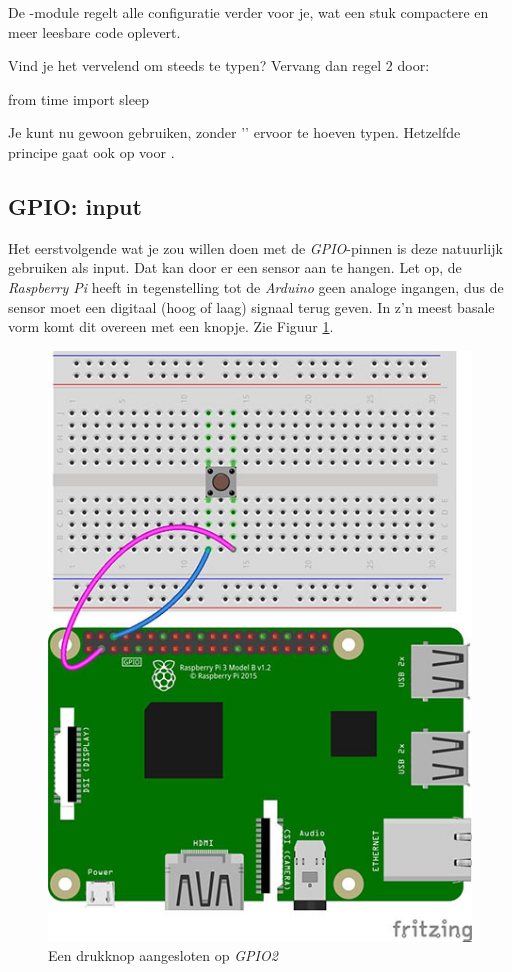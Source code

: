 De -module regelt alle configuratie verder voor je, wat een stuk compactere en meer leesbare code oplevert. 
\begin{remark}
\label{sec:piledobj}
Vind je het vervelend om steeds  te typen? Vervang dan regel $2$ door: 
\begin{python}
from time import sleep
\end{python}
Je kunt nu gewoon  gebruiken, zonder '' ervoor te hoeven typen. Hetzelfde principe gaat ook op voor .
\end{remark}

\newpage

\subsection{GPIO: input}
Het eerstvolgende wat je zou willen doen met de \textit{GPIO}-pinnen is deze natuurlijk gebruiken als input. Dat kan door er een sensor aan te hangen. Let op, de \textit{Raspberry Pi} heeft in tegenstelling tot de \textit{Arduino} geen analoge ingangen, dus de sensor moet een digitaal (hoog of laag) signaal terug geven. In z'n meest basale vorm komt dit overeen met een knopje. Zie Figuur \ref{fig:pi_button}. 

\begin{figure}[h!]
\centering\includegraphics[scale=0.45]{Pictures/chapter05/pi_button_01.jpg}
\caption{Een drukknop aangesloten op \textit{GPIO2}}
\label{fig:pi_button} %
\end{figure}

